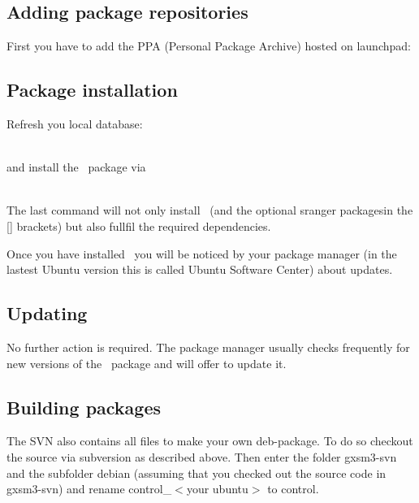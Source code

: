 \subsection{Adding package repositories}
First you have to add the PPA (Personal Package Archive) hosted on launchpad:





\subsection{Package installation}
Refresh you local database:

\\[1mm] and install the \Gxsm\ package via

\\[1mm] The last command will not only install
\Gxsm\ (and the optional sranger packagesin the [] brackets) but also fullfil
the required dependencies. 

Once you have installed \Gxsm\ you will be noticed by your package manager (in
the lastest Ubuntu version this is called Ubuntu Software Center) about
updates.


\subsection{Updating}

No further action is required. The package manager usually checks frequently
for new versions of the \Gxsm\ package and will offer to update it.

\subsection{Building packages} 

The SVN also contains all files to make your own deb-package. To do so
checkout the source via subversion as described above. Then enter the folder
gxsm3-svn and the subfolder debian (assuming that you checked out the
source code in gxsm3-svn) and rename control\_$<$your ubuntu$>$ to control.

